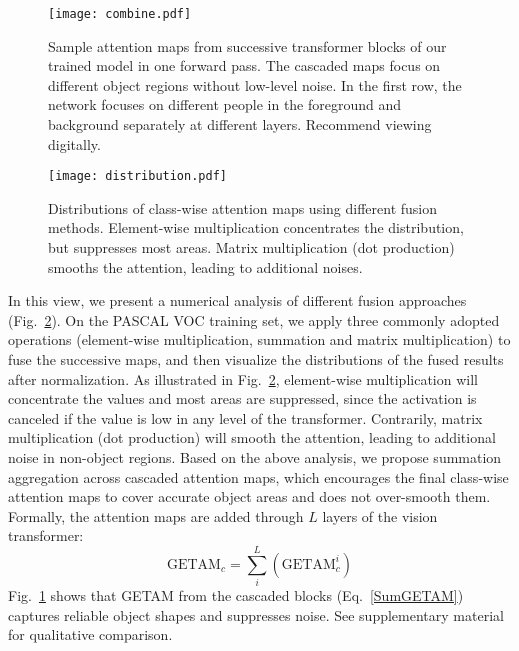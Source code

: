 \documentclass[10pt,twocolumn,letterpaper]{article}
\begin{document}
\begin{figure}[!t]
   \begin{center}
   {\texttt{[image: combine.pdf]}} 
   \end{center}
\caption{Sample attention maps from successive transformer blocks of our trained model in one forward pass. The cascaded maps focus on different object regions without low-level noise.
In the first row, the network focuses on different people in the foreground and background separately at different layers.
Recommend viewing digitally. 
}
\label{fig:combine}
\end{figure}


\begin{figure}[!t]
   \begin{center}
   {\texttt{[image: distribution.pdf]}} 
   \end{center}
\caption{Distributions of class-wise attention maps using different fusion methods. Element-wise multiplication concentrates the distribution, but suppresses most areas. Matrix multiplication (dot production) smooths the attention, leading to additional noises.
}
\label{fig:distribution}
\end{figure}

In this view, we present a numerical analysis of different fusion approaches (Fig.~\ref{fig:distribution}). 
On the PASCAL VOC \cite{everingham2010pascal} training set, we apply three commonly adopted operations (element-wise multiplication, summation and matrix multiplication) to fuse the successive maps, and then visualize the distributions of the fused results after normalization.
As illustrated in Fig.~\ref{fig:distribution}, element-wise multiplication will concentrate the values and most areas are suppressed, since the activation is canceled if the value is low 
in any level of the transformer. Contrarily, matrix multiplication (dot production) will smooth the attention, leading to additional noise in non-object regions.
Based on the above analysis, we propose summation aggregation across cascaded attention maps, which encourages the final class-wise attention maps to cover accurate object areas and does not over-smooth them.
Formally, the attention maps are added through $L$ layers of the vision transformer:
\begin{equation}
    \text{GETAM}_c = \sum^L_{i} (\text{GETAM}_c^i)
    \label{SumGETAM}
\end{equation}
Fig.~\ref{fig:combine} shows that GETAM from the cascaded blocks (Eq.~\ref{SumGETAM})
captures reliable object shapes and suppresses noise.
See supplementary material for 
qualitative comparison.
\end{document}

